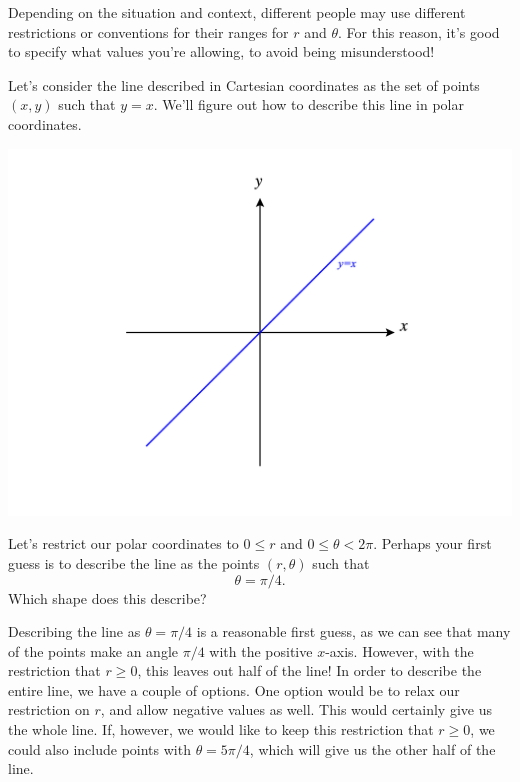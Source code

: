 \documentclass{ximera}
\begin{document}
Depending on the situation and context, different people may use different restrictions or conventions for their ranges for $r$ and $\theta$. For this reason, it's good to specify what values you're allowing, to avoid being misunderstood!

\begin{example}
Let's consider the line described in Cartesian coordinates as the set of points $(x,y)$ such that $y=x$. We'll figure out how to describe this line in polar coordinates.

\begin{image}
\includegraphics[width=\textwidth]{CalcPlot3D-y_equals_x}
\end{image}

Let's restrict our polar coordinates to $0\leq r$ and $0\leq \theta <2\pi$. Perhaps your first guess is to describe the line as the points $(r,\theta)$ such that
\[
\theta = \pi/4 .
\]
Which shape does this describe?
\begin{multipleChoice}
\end{multipleChoice}

Describing the line as $\theta = \pi/4$ is a reasonable first guess, as we can see that many of the points make an angle $\pi/4$ with the positive $x$-axis. However, with the restriction that $r\geq 0$, this leaves out half of the line! In order to describe the entire line, we have a couple of options. One option would be to relax our restriction on $r$, and allow negative values as well. This would certainly give us the whole line. If, however, we would like to keep this restriction that $r\geq 0$, we could also include points with $\theta = 5\pi/4$, which will give us the other half of the line.


\end{example}
\end{document}
